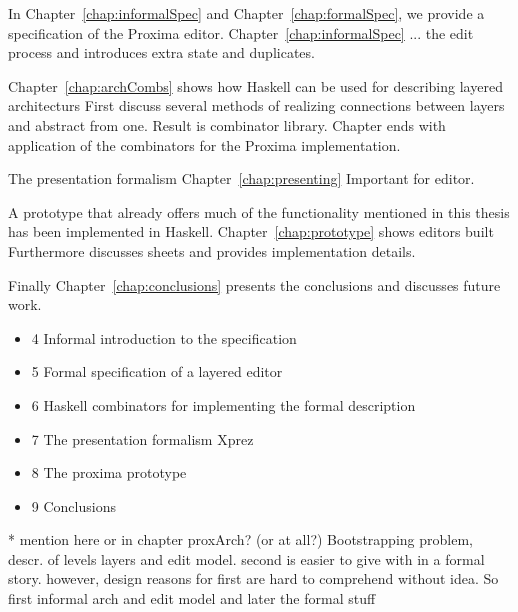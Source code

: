 In Chapter~\ref{chap:informalSpec} and Chapter~\ref{chap:formalSpec}, we provide a specification of the Proxima editor. Chapter~\ref{chap:informalSpec} ... the edit process and introduces extra state and duplicates. 

Chapter~\ref{chap:archCombs} shows how Haskell can be used for describing layered architecturs
First discuss several methods of realizing connections between layers and abstract from one. Result is combinator library. Chapter ends with application of the combinators for the Proxima implementation.

The presentation formalism {\Xprez} Chapter~\ref{chap:presenting} Important for editor.

A prototype that already offers much of the functionality mentioned in this thesis has been implemented in Haskell. Chapter~\ref{chap:prototype} shows editors built Furthermore discusses sheets and provides implementation details.

Finally Chapter~\ref{chap:conclusions} presents the conclusions and discusses future work.  %
\bc
\begin{itemize}
\item 4 Informal introduction to the specification
\item 5 Formal specification of a layered editor
\item 6 Haskell combinators for implementing the formal description
\item 7 The presentation formalism {\sc Xprez}
\item 8 The proxima prototype
\item 9 Conclusions
\end{itemize}
* mention here or in chapter proxArch? (or at all?)
Bootstrapping problem, descr. of levels layers and edit model. second is easier to give with in a formal story. however, design reasons for first are hard to comprehend without idea. So first informal arch and edit model and later the formal stuff


\ec
